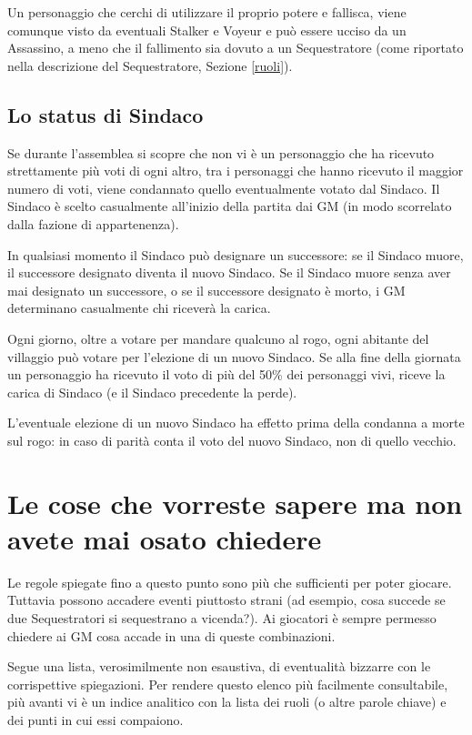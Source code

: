 \documentclass[a4paper,10pt]{article}
\begin{document}
Un personaggio che cerchi di utilizzare il proprio potere e fallisca, viene comunque visto da eventuali Stalker e Voyeur e può essere ucciso da un Assassino, a meno che il fallimento sia dovuto a un Sequestratore (come riportato nella descrizione del Sequestratore, Sezione \ref{ruoli}).

\subsection{Lo status di Sindaco}
\label{sindaco}

Se durante l'assemblea si scopre che non vi è un personaggio che ha ricevuto strettamente più voti di ogni altro, tra i personaggi che hanno ricevuto il maggior numero di voti, viene condannato quello eventualmente votato dal
Sindaco.
Il Sindaco è scelto casualmente all'inizio della partita dai GM (in modo scorrelato dalla fazione di appartenenza).

In qualsiasi momento il Sindaco può designare un successore: se il Sindaco muore, il successore designato diventa il nuovo Sindaco. Se il Sindaco muore senza aver mai designato un successore, o se il successore designato è morto, i GM determinano casualmente chi riceverà la carica.

Ogni giorno, oltre a votare per mandare qualcuno al rogo, ogni abitante del villaggio può votare per l'elezione di un nuovo Sindaco. Se alla fine della giornata un personaggio ha ricevuto il voto di più del 50\% dei personaggi vivi, riceve la carica di Sindaco (e il Sindaco precedente la perde).

L'eventuale elezione di un nuovo Sindaco ha effetto prima della condanna a morte sul rogo: in caso di parità conta il voto del nuovo Sindaco, non di quello vecchio.


\pagebreak
\section{Le cose che vorreste sapere ma non avete mai osato chiedere}
\label{faq}

Le regole spiegate fino a questo punto sono più che sufficienti per poter giocare. Tuttavia possono accadere eventi piuttosto strani (ad esempio, cosa succede se due Sequestratori si sequestrano a vicenda?). Ai giocatori è sempre permesso chiedere ai GM cosa accade in una di queste combinazioni.

Segue una lista, verosimilmente non esaustiva, di eventualità bizzarre con le corrispettive spiegazioni.
Per rendere questo elenco più facilmente consultabile, più avanti vi è un indice analitico con la lista dei ruoli (o altre parole chiave) e dei punti in cui essi compaiono.
\end{document}

